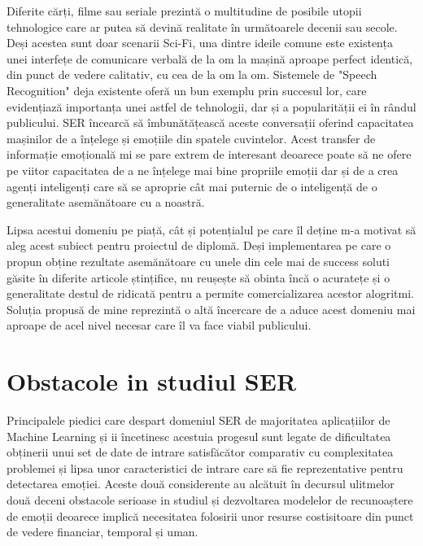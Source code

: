 \documentclass[a4paper,12pt]{book}
\begin{document}
					Diferite cărți, filme sau seriale prezintă o multitudine de posibile utopii tehnologice care ar putea să devină realitate în următoarele decenii sau secole. Deși acestea sunt doar scenarii Sci-Fi, una dintre ideile comune este existența unei interfețe de comunicare verbală de la om la mașină aproape perfect identică, din punct de vedere calitativ, cu cea de la om la om. Sistemele de "Speech Recognition" deja existente oferă un bun exemplu prin succesul lor, care evidențiază importanța unei astfel de tehnologii, dar și a popularității ei în rândul publicului. SER încearcă să îmbunătățească aceste conversații oferind capacitatea mașinilor de a înțelege și emoțiile din spatele cuvintelor. Acest transfer de informație emoțională mi se pare extrem de interesant deoarece poate să ne ofere pe viitor capacitatea de a ne înțelege mai bine propriile emoții dar și de a crea agenți inteligenți care să se aproprie cât mai puternic de o inteligență de o generalitate asemănătoare cu a noastră. \par
					
					Lipsa acestui domeniu pe piață, cât și potențialul pe care îl deține m-a motivat să aleg acest subiect pentru proiectul de diplomă. Deși implementarea pe care o propun obține rezultate asemănătoare cu unele din cele mai de success soluti găsite în diferite articole ștințifice, nu reușește să obinta încă o acuratețe și o  generalitate destul de ridicată pentru a permite comercializarea acestor alogritmi. Soluția propusă de mine reprezintă o altă încercare de a aduce acest domeniu mai aproape de acel nivel necesar care îl va face viabil publicului. \par  
										
			\section{Obstacole in studiul SER}	\label{obstacole}	
			 	Principalele piedici care despart domeniul SER de majoritatea aplicațiilor de Machine Learning și ii încetinesc acestuia progesul sunt legate de dificultatea obținerii unui set de date de intrare satisfăcător comparativ cu complexitatea problemei și lipsa unor caracteristici de intrare care să fie reprezentative pentru detectarea emoției. Aceste două considerente au alcătuit în decursul ulitmelor două deceni obstacole serioase in studiul și dezvoltarea modelelor de recunoaștere de emoții deoarece implică necesitatea folosirii unor resurse costisitoare din punct de vedere financiar, temporal și uman.\par
				
\end{document}

